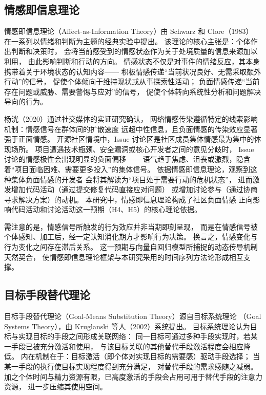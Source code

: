 \subsection{情感即信息理论}

情感即信息理论（Affect-as-Information Theory）由 Schwarz 和 Clore（1983）
在一系列以情绪和判断为主题的经典实验中提出\cite{schwarz1983moods}。
该理论的核心主张是：个体作出判断和决策时，
会将当前感受到的情感状态作为关于处境质量的信息来源加以利用，
由此影响判断和行动的方向。
情感状态不仅是对事件的情绪反应，其本身携带着关于环境状态的认知内容——
积极情感传递“当前状况良好、无需采取额外行动”的信号，
促使个体倾向于维持现状或从事探索性活动；
负面情感传递“当前存在问题或威胁、需要警惕与应对”的信号，
促使个体转向系统性分析和问题解决导向的行为。

杨{\notoserifjk 洸}（2020）通过社交媒体的实证研究确认，
网络情感传染遵循特定的线索影响机制：情感信号在群体间的扩散速度
远超中性信息，且负面情感的传染效应显著强于正面情感\cite{yang2020sentiment}。
开源社区情境中，Issue 讨论区是社区成员集体情感最为集中的体现场所。
项目遭遇技术瓶颈、安全漏洞或核心开发者之间的意见分歧时，
Issue 讨论的情感极性会出现明显的负面偏移——
语气趋于焦虑、沮丧或激烈，隐含着“项目面临困难、需要更多投入”的集体信号。
依据情感即信息理论，观察到这种集体负面情感的开发者
会将其解读为“项目处于需要行动的危机状态”，
进而激发增加代码活动（通过提交修复代码直接应对问题）
或增加讨论参与（通过协商寻求解决方案）的动机。
本研究中，情感即信息理论构成了社区负面情感
正向影响代码活动和讨论活动这一预期（H4、H5）的核心理论依据。

需注意的是，情感信号所触发的行为效应并非当期即刻呈现，
而是在情感信号被个体感知、加工后，经一定认知消化期方才影响行为决策。
换言之，情感变化与行为变化之间存在滞后关系。
这一预期与向量自回归模型所捕捉的动态传导机制天然契合，
使情感即信息理论框架与本研究采用的时间序列方法论形成相互支撑。

\subsection{目标手段替代理论}

目标手段替代理论（Goal-Means Substitution Theory）源自目标系统理论
（Goal Systems Theory），由 Kruglanski 等人（2002）系统提出\cite{kruglanski2002theory}。
目标系统理论认为目标与实现目标的手段之间形成关联网络：
同一目标可通过多种手段实现时，若某一手段已被充分激活和使用，
与该目标关联的其他替代手段激活程度会相应降低。
内在机制在于：目标激活（即个体对实现目标的需要感）驱动手段选择；
当某一手段的执行使目标实现程度得到充分满足，
对替代手段的需求感随之减弱。
加之个体时间与精力资源有限，已高度激活的手段会占用可用于替代手段的注意力资源，
进一步压缩其使用空间。

